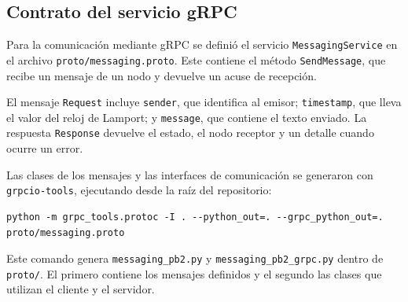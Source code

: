 
\subsection{Contrato del servicio gRPC}

Para la comunicación mediante gRPC se definió el servicio \texttt{MessagingService} en el archivo \texttt{proto/messaging.proto}. Este contiene el método \texttt{SendMessage}, que recibe un mensaje de un nodo y devuelve un acuse de recepción.

El mensaje \texttt{Request} incluye \texttt{sender}, que identifica al emisor; \texttt{timestamp}, que lleva el valor del reloj de Lamport; y \texttt{message}, que contiene el texto enviado. La respuesta \texttt{Response} devuelve el estado, el nodo receptor y un detalle cuando ocurre un error.



Las clases de los mensajes y las interfaces de comunicación se generaron con \texttt{grpcio-tools}, ejecutando desde la raíz del repositorio:

\begin{lstlisting}
python -m grpc_tools.protoc -I . --python_out=. --grpc_python_out=. proto/messaging.proto
\end{lstlisting}

Este comando genera \texttt{messaging\_pb2.py} y \texttt{messaging\_pb2\_grpc.py} dentro de \texttt{proto/}. El primero contiene los mensajes definidos y el segundo las clases que utilizan el cliente y el servidor.

